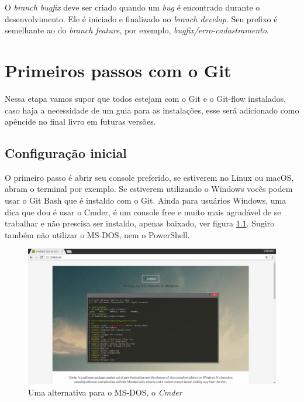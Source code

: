 \documentclass[12pt,openright,oneside,a4paper,english,brazil]{abntex2}
\begin{document}
O \textit{branch bugfix} deve ser criado quando um \textit{bug} é encontrado durante o desenvolvimento. Ele é iniciado e finalizado no \textit{branch develop}. Seu prefixo é semelhante ao do \textit{branch feature}, por exemplo, \textit{bugfix/erro-cadastramento}.

\chapter{Primeiros passos com o Git}

Nessa etapa vamos supor que todos estejam com o Git e o Git-flow instalados, caso haja a necessidade de um guia para as instalações, esse será adicionado como apêncide no final livro em futuras versões.

\section{Configuração inicial \label{configinicial}}

O primeiro passo é abrir seu console preferido, se estiverem no Linux ou macOS, abram o terminal por exemplo. Se estiverem utilizando o Windows vocês podem usar o Git Bash que é instaldo com o Git. Ainda para usuários Windows, uma dica que dou é usar o Cmder, é um console free e muito mais agradável de se trabalhar e não prescisa ser instaldo, apenas baixado, ver figura \ref{cmder}. Sugiro também não utilizar o MS-DOS, nem o PowerShell.

\begin{figure}[h]
	\caption{\label{cmder}Uma alternativa para o MS-DOS, o \textit{Cmder}}
	\begin{center}
		\includegraphics[width=1\linewidth]{imagens/cmder}
	\end{center}
\end{figure}
\end{document}
